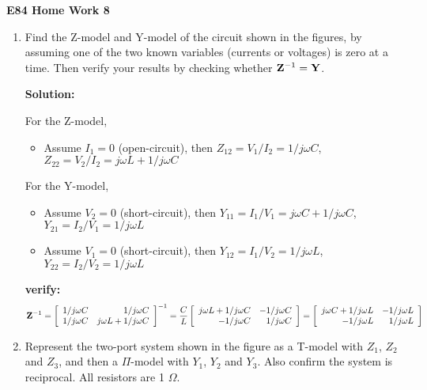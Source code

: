 \usepackage{html}

\begin{center}
{\Large \bf E84 Home Work 8}
\end{center}
\begin{enumerate}


\item Find the Z-model and Y-model of the circuit shown in the figures, by
assuming one of the two known variables (currents or voltages) is zero at
a time. Then verify your results by checking whether ${\bf Z}^{-1}={\bf Y}$.


 {\bf Solution:}

 For the Z-model, 
 \begin{itemize}
 item Assume $I_2=0$ (open-circuit), then
 	$Z_{11}=V_1/I_1=1/j\omega C$, $Z_{21}=V_2/I_1=1/j\omega C$
 \item Assume $I_1=0$ (open-circuit), then
 	$Z_{12}=V_1/I_2=1/j\omega C$, $Z_{22}=V_2/I_2=j\omega L+1/j\omega C$
 \end{itemize}
 For the Y-model, 
 \begin{itemize}
 \item Assume $V_2=0$ (short-circuit), then
 	$Y_{11}=I_1/V_1=j\omega C+1/j\omega C$, $Y_{21}=I_2/V_1=1/j\omega L$
 \item Assume $V_1=0$ (short-circuit), then
 	$Y_{12}=I_1/V_2=1/j\omega L$, $Y_{22}=I_2/V_2=1/j\omega L$
 \end{itemize}
 {\bf verify:}
 \[ {\bf Z}^{-1}=\left[ \begin{array}{rr} 1/j\omega C & 1/j\omega C \\
 	1/j\omega C & j\omega L+1/j\omega C \end{array} \right]^{-1}
 	=\frac{C}{L}\left[ \begin{array}{rr} j\omega L+1/j\omega C & -1/j\omega C \\
 	-1/j\omega C & 1/j\omega C \end{array} \right]
 	=\left[ \begin{array}{rr} j\omega C+1/j\omega L & -1/j\omega L \\
 	-1/j\omega L & 1/j\omega L \end{array} \right]
 \]

\item Represent the two-port system shown in the figure as a T-model with
$Z_1$, $Z_2$ and $Z_3$, and then a $\Pi$-model with $Y_1$, $Y_2$ and 
$Y_3$. Also confirm the system is reciprocal. All resistors are 1 $\Omega$.


\end{enumerate}
